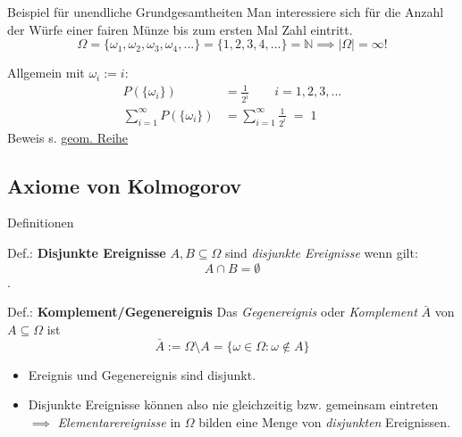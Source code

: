 \documentclass[
  10pt,
  ignorenonframetext,
]{beamer}
\providecommand{\tightlist}{%
  \setlength{\itemsep}{0pt}\setlength{\parskip}{0pt}}
\begin{document}
\begin{frame}{Beispiel für unendliche Grundgesamtheiten}
\protect\hypertarget{beispiel-fuxfcr-unendliche-grundgesamtheiten}{}
Man interessiere sich für die Anzahl der Würfe einer fairen Münze bis
zum ersten Mal Zahl eintritt.
\[\Omega = \{\omega_1, \omega_2,\omega_3, \omega_4, ...  \} = \{1, 2, 3, 4, ...\} = \mathbb{N} \implies |\Omega| = \infty!\]

Allgemein mit \(\omega_i := {i}\): \begin{align*}
P(\{\omega_i\}) &= \frac{1}{2^i} \qquad i = 1, 2, 3, ...\\
\sum\limits_{i=1}^{\infty} P(\{\omega_i\}) & =  \sum\limits_{i=1}^{\infty}  \frac{1}{2^i}   \; = \;  1 \qquad
\end{align*} \vspace{0pt plus 1filll} \footnotesize Beweis s.
\href{https://de.wikipedia.org/wiki/Geometrische_Reihe}{geom. Reihe}
\end{frame}

\hypertarget{axiome-von-kolmogorov}{%
\subsection{Axiome von Kolmogorov}\label{axiome-von-kolmogorov}}

\begin{frame}{Definitionen}
\protect\hypertarget{definitionen}{}
\begin{block}{Def.: \textbf{Disjunkte Ereignisse}}
\protect\hypertarget{def.-disjunkte-ereignisse}{}
\(A,B \subseteq \Omega\) sind \emph{disjunkte Ereignisse} wenn gilt:
\[A \cap B = \emptyset\].
\end{block}

\begin{block}{Def.: \textbf{Komplement/Gegenereignis}}
\protect\hypertarget{def.-komplementgegenereignis}{}
Das \emph{Gegenereignis} oder \emph{Komplement} \(\bar A\) von
\(A \subseteq \Omega\) ist
\[\bar A := \Omega \setminus A = \{\omega \in \Omega: \omega \notin A\}\]
\end{block}

\begin{itemize}
\tightlist
\item
  Ereignis und Gegenereignis sind disjunkt.
\item
  Disjunkte Ereignisse können also nie gleichzeitig bzw. gemeinsam
  eintreten\\
  \(\implies\) \emph{Elementarereignisse} in \(\Omega\) bilden eine
  Menge von \emph{disjunkten} Ereignissen.
\end{itemize}

\end{frame}
\end{document}
